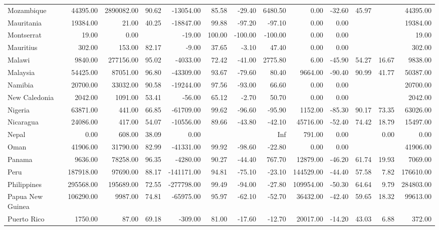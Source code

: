\begin{table}[ht]
\begin{tabular}{lrrrrrrrrrrrr}
  Mozambique & 44395.00 & 2890082.00 & 90.62 & -13054.00 & 85.58 & -29.40 & 6480.50 & 0.00 & -32.60 & 45.97 &  & 44395.00 \\ 
  Mauritania & 19384.00 & 21.00 & 40.25 & -18847.00 & 99.88 & -97.20 & -97.10 & 0.00 & 0.00 &  &  & 19384.00 \\ 
  Montserrat & 19.00 & 0.00 &  & -19.00 & 100.00 & -100.00 & -100.00 & 0.00 & 0.00 &  &  & 19.00 \\ 
  Mauritius & 302.00 & 153.00 & 82.17 & -9.00 & 37.65 & -3.10 & 47.40 & 0.00 & 0.00 &  &  & 302.00 \\ 
  Malawi & 9840.00 & 277156.00 & 95.02 & -4033.00 & 72.42 & -41.00 & 2775.80 & 6.00 & -45.90 & 54.27 & 16.67 & 9838.00 \\ 
  Malaysia & 54425.00 & 87051.00 & 96.80 & -43309.00 & 93.67 & -79.60 & 80.40 & 9664.00 & -90.40 & 90.99 & 41.77 & 50387.00 \\ 
  Namibia & 20700.00 & 33032.00 & 90.58 & -19244.00 & 97.56 & -93.00 & 66.60 & 0.00 & 0.00 &  &  & 20700.00 \\ 
  New Caledonia & 2042.00 & 1091.00 & 53.41 & -56.00 & 65.12 & -2.70 & 50.70 & 0.00 & 0.00 &  &  & 2042.00 \\ 
  Nigeria & 63871.00 & 441.00 & 66.85 & -61709.00 & 99.62 & -96.60 & -95.90 & 1152.00 & -85.30 & 90.17 & 73.35 & 63026.00 \\ 
  Nicaragua & 24086.00 & 417.00 & 54.07 & -10556.00 & 89.66 & -43.80 & -42.10 & 45716.00 & -52.40 & 74.42 & 18.79 & 15497.00 \\ 
  Nepal & 0.00 & 608.00 & 38.09 & 0.00 &  &  & Inf & 791.00 & 0.00 &  & 0.00 & 0.00 \\ 
  Oman & 41906.00 & 31790.00 & 82.99 & -41331.00 & 99.92 & -98.60 & -22.80 & 0.00 & 0.00 &  &  & 41906.00 \\ 
  Panama & 9636.00 & 78258.00 & 96.35 & -4280.00 & 90.27 & -44.40 & 767.70 & 12879.00 & -46.20 & 61.74 & 19.93 & 7069.00 \\ 
  Peru & 187918.00 & 97690.00 & 88.17 & -141171.00 & 94.81 & -75.10 & -23.10 & 144529.00 & -44.40 & 57.58 & 7.82 & 176610.00 \\ 
  Philippines & 295568.00 & 195689.00 & 72.55 & -277798.00 & 99.49 & -94.00 & -27.80 & 109954.00 & -50.30 & 64.64 & 9.79 & 284803.00 \\ 
  Papua New Guinea & 106290.00 & 9987.00 & 74.81 & -65975.00 & 95.97 & -62.10 & -52.70 & 36432.00 & -42.40 & 59.65 & 18.32 & 99613.00 \\ 
  Puerto Rico & 1750.00 & 87.00 & 69.18 & -309.00 & 81.00 & -17.60 & -12.70 & 20017.00 & -14.20 & 43.03 & 6.88 & 372.00 \\ 

\end{tabular}
\end{table}
